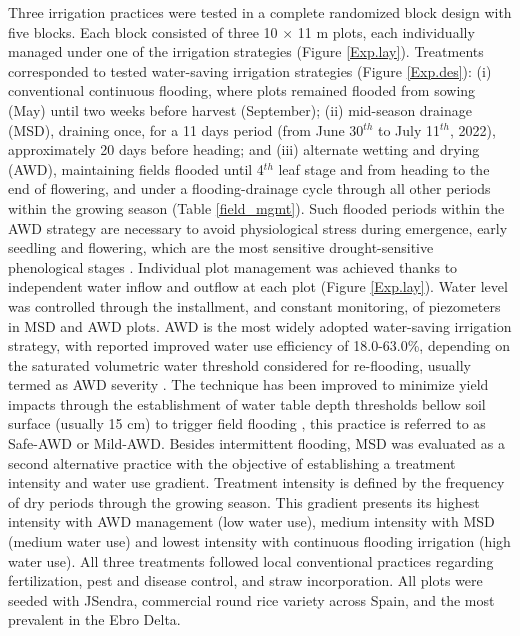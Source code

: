 Three irrigation practices were tested in a complete randomized block design with five blocks. Each block consisted of three 10 $\times$ 11 m plots, each individually managed under one of the irrigation strategies (Figure \ref{Exp.lay}). Treatments corresponded to tested water-saving irrigation strategies (Figure \ref{Exp.des}): (i) conventional continuous flooding, where plots remained flooded from sowing (May) until two weeks before harvest (September); (ii) mid-season drainage (MSD), draining once, for a 11 days period (from June 30$^{th}$ to July 11$^{th}$, 2022), approximately 20 days before heading; and (iii) alternate wetting and drying (AWD), maintaining fields flooded until 4$^{th}$ leaf stage and from heading to the end of flowering, and under a flooding-drainage cycle through all other periods within the growing season (Table \ref{field_mgmt}). Such flooded periods within the AWD strategy are necessary to avoid physiological stress during emergence, early seedling  and flowering, which are the most sensitive drought-sensitive phenological stages \citep{singh2017developing, yang2019different}. Individual plot management was achieved thanks to independent water inflow and outflow at each plot (Figure \ref{Exp.lay}). Water level was controlled through the installment, and constant monitoring, of piezometers in MSD and AWD plots. AWD is the most widely adopted water-saving irrigation strategy, with reported improved water use efficiency of 18.0-63.0\%, depending on the saturated volumetric water threshold considered for re-flooding, usually termed as AWD severity \citep{linquist2015}. The technique has been improved to minimize yield impacts through the establishment of water table depth thresholds bellow soil surface (usually 15 cm) to trigger field flooding \citep{carrijo2017}, this practice is referred to as Safe-AWD or Mild-AWD. Besides intermittent flooding, MSD was evaluated as a second alternative practice with the objective of establishing a treatment intensity and water use gradient. Treatment intensity is defined by the frequency of dry periods through the growing season. This gradient presents its highest intensity with AWD management (low water use), medium intensity with MSD (medium water use) and lowest intensity with continuous flooding irrigation (high water use). All three treatments followed local conventional practices regarding fertilization, pest and disease control, and straw incorporation. All plots were seeded with JSendra, commercial round rice variety across Spain, and the most prevalent in the Ebro Delta.\\

